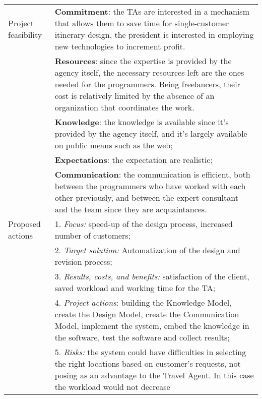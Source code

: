 \begin{tabular}%
       {|p{3cm}%
        |p{9.5cm}|}
\hline
\sc Project feasibility
 & {\rm \textbf{Commitment}: the TAs are interested in a mechanism that allows them to save time for single-customer itinerary design, the president is interested in employing new technologies to increment profit.} \\
 & {\rm \textbf{Resources}: since the expertise is provided by the agency itself, the necessary resources left are the ones needed for the programmers. Being freelancers, their cost is relatively limited by the absence of an organization that coordinates the work.} \\
 & {\rm \textbf{Knowledge}: the knowledge is available since it's provided by the agency itself, and it's largely available on public means such as the web;} \\
 & {\rm \textbf{Expectations}: the expectation are realistic;} \\
 & {\rm \textbf{Communication}: the communication is efficient, both between the programmers who have worked with each other previously, and between the expert consultant and the team since they are acquaintances.} \\
\hline
\sc Proposed actions
 & {\rm 1. {\em Focus:} speed-up of the design process, increased number of customers;} \\
 & {\rm 2. {\em Target solution:} Automatization of the design and revision process;} \\
 & {\rm 3. {\em Results, costs, and benefits:} satisfaction of the client, saved workload and working time for the TA;} \\
 & {\rm 4. {\em Project actions}: building the Knowledge Model, create the Design Model, create the Communication Model, implement the system, embed the knowledge in the software, test the software and collect results;} \\
 & {\rm 5. {\em Risks:} the system could have difficulties in selecting the right locations based on customer's requests, not posing as an advantage to the Travel Agent. In this case the workload would not decrease} \\
\hline
\end{tabular}





